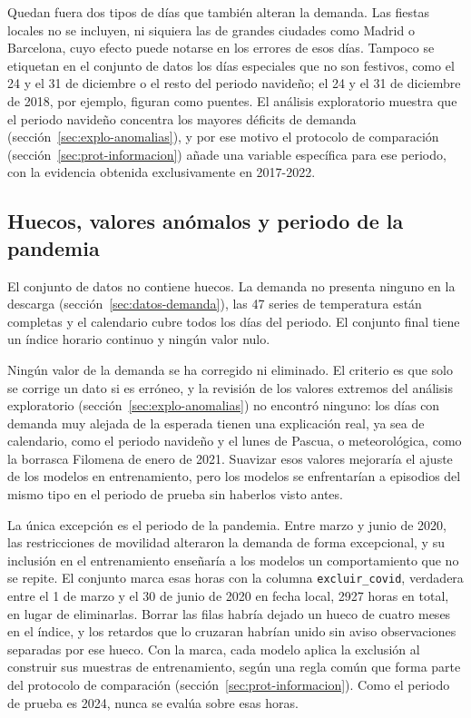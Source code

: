 Quedan fuera dos tipos de días que también alteran la demanda. Las fiestas
locales no se incluyen, ni siquiera las de grandes ciudades como Madrid o
Barcelona, cuyo efecto puede notarse en los errores de esos días. Tampoco se
etiquetan en el conjunto de datos los días especiales que no son festivos,
como el 24 y el 31 de diciembre o el resto del periodo navideño; el 24 y el
31 de diciembre de 2018, por ejemplo, figuran como puentes. El análisis
exploratorio muestra que el periodo navideño concentra los mayores déficits
de demanda (sección~\ref{sec:explo-anomalias}), y por ese motivo el
protocolo de comparación (sección~\ref{sec:prot-informacion}) añade una
variable específica para ese periodo, con
la evidencia obtenida exclusivamente en 2017-2022.

\subsection{Huecos, valores anómalos y periodo de la pandemia}\label{sec:datos-anomalias}

El conjunto de datos no contiene huecos. La demanda no presenta ninguno en
la descarga (sección~\ref{sec:datos-demanda}), las 47 series de temperatura
están completas y el calendario cubre todos los días del periodo. El
conjunto final tiene un índice horario continuo y ningún valor nulo.

Ningún valor de la demanda se ha corregido ni eliminado. El criterio es que
solo se corrige un dato si es erróneo, y la revisión de los valores extremos
del análisis exploratorio (sección~\ref{sec:explo-anomalias}) no encontró
ninguno: los días con demanda muy alejada de la esperada tienen una
explicación real, ya sea de calendario, como el periodo navideño y el lunes
de Pascua, o meteorológica, como la borrasca Filomena de enero de 2021.
Suavizar esos valores mejoraría el ajuste de los modelos en entrenamiento,
pero los modelos se enfrentarían a episodios del mismo tipo en el periodo de
prueba sin haberlos visto antes.

La única excepción es el periodo de la pandemia. Entre marzo y junio de 2020,
las restricciones de movilidad alteraron la demanda de forma excepcional, y
su inclusión en el entrenamiento enseñaría a los modelos un comportamiento
que no se repite. El conjunto marca esas horas con la columna
\texttt{excluir\_covid}, verdadera entre el 1 de marzo y el 30 de junio de
2020 en fecha local, 2927 horas en total, en lugar de eliminarlas. Borrar las
filas habría dejado un hueco de cuatro meses en el índice, y los retardos que
lo cruzaran habrían unido sin aviso observaciones separadas por ese hueco.
Con la marca, cada modelo aplica la exclusión al construir sus muestras de
entrenamiento, según una regla común que forma parte del protocolo de
comparación (sección~\ref{sec:prot-informacion}). Como el periodo de prueba
es 2024, nunca se evalúa sobre esas
horas.

